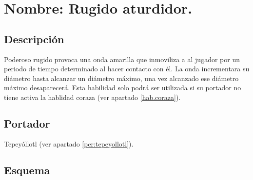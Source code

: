 \section{Nombre: Rugido aturdidor.}\label{hab.RugAtur}
\subsection{Descripción}
Poderoso rugido provoca una onda amarilla que inmoviliza a al jugador por un periodo de tiempo determinado al hacer contacto con él. La onda incrementara su diámetro hasta alcanzar un diámetro máximo, una vez alcanzado ese diámetro máximo desaparecerá. Esta habilidad solo podrá ser utilizada si su portador no tiene activa la hablidad coraza (ver apartado \ref{hab.coraza}).
\subsection{Portador}
Tepeyóllotl (ver apartado \ref{per:tepeyollotl}). 
\subsection{Esquema}
			